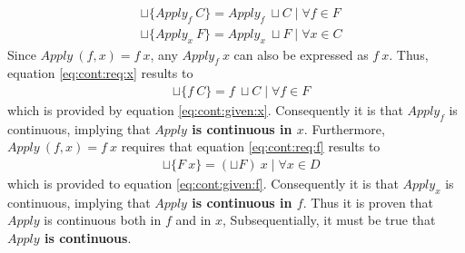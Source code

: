 \begin{align}
	& \sqcup \{ Apply_f \ C \} = Apply_f \ \sqcup C \mid \forall f \in F \label{eq:cont:req:x} \\
	& \sqcup \{ Apply_x \ F \} = Apply_x \ \sqcup F \mid \forall x \in C \label{eq:cont:req:f}
\end{align}
Since $Apply \ (f,x) = f \ x$, any $Apply_f \ x$ can also be expressed as $f \ x$. Thus, equation \ref{eq:cont:req:x} results to
\begin{align}
	& \sqcup \{ f \ C \} = f \ \sqcup C \mid \forall f \in F
\end{align}
which is provided by equation \ref{eq:cont:given:x}. Consequently it is that $Apply_f$ is continuous, implying that	\textbf{$Apply$ is continuous in $x$}. 
Furthermore, $Apply \ (f,x) = f \ x$ requires that equation \ref{eq:cont:req:f} results to
\begin{align}
	& \sqcup \{ F \ x \} = (\sqcup F) \ x \mid \forall x \in D
\end{align}
which is provided to equation \ref{eq:cont:given:f}. Consequently it is that $Apply_x$ is continuous, implying that	\textbf{$Apply$ is continuous in $f$}. 
Thus it is proven that $Apply$ is continuous both in $f$ and in $x$, Subsequentially, it must be true that \textbf{$Apply$ is continuous}.